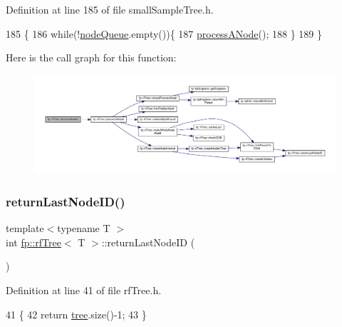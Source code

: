 Definition at line 185 of file small\+Sample\+Tree.\+h.


\begin{DoxyCode}
185                                    \{
186                     \textcolor{keywordflow}{while}(!\hyperlink{classfp_1_1rfTree_af72d0a2f930fd480dfb4858885c2df23}{nodeQueue}.empty())\{
187                         \hyperlink{classfp_1_1rfTree_ab7760333f6857ab7ce2ee29a7bc16e65}{processANode}();
188                     \}
189                 \}
\end{DoxyCode}
Here is the call graph for this function\+:
\nopagebreak
\begin{figure}[H]
\begin{center}
\leavevmode
\includegraphics[width=350pt]{classfp_1_1rfTree_a7997df3477bc9f73163384c8cd0bcec9_cgraph}
\end{center}
\end{figure}
\mbox{\label{classfp_1_1rfTree_a1b8c04f3f3ce362d9627c2ca66d10efd}} 
\subsubsection{\texorpdfstring{return\+Last\+Node\+I\+D()}{returnLastNodeID()}\hspace{0.1cm}{\footnotesize\ttfamily [1/2]}}
{\footnotesize\ttfamily template$<$typename T $>$ \\
int \hyperlink{classfp_1_1rfTree}{fp\+::rf\+Tree}$<$ T $>$\+::return\+Last\+Node\+ID (\begin{DoxyParamCaption}{ }\end{DoxyParamCaption})\hspace{0.3cm}{\ttfamily [inline]}}



Definition at line 41 of file rf\+Tree.\+h.


\begin{DoxyCode}
41                                              \{
42                     \textcolor{keywordflow}{return} \hyperlink{classfp_1_1rfTree_a1d5c209715f4044a85878c17e2b3ee53}{tree}.size()-1;
43                 \}
\end{DoxyCode}
\mbox{\label{classfp_1_1rfTree_a1b8c04f3f3ce362d9627c2ca66d10efd}} 
